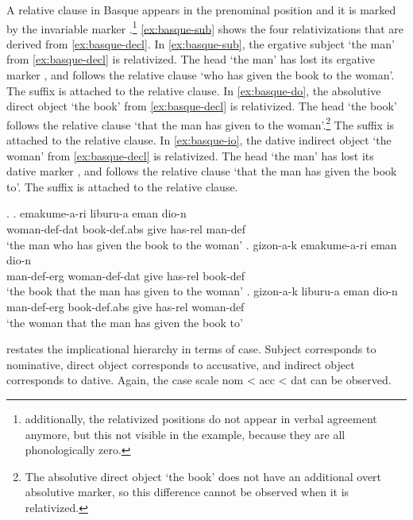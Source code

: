 A relative clause in Basque appears in the prenominal position and it is marked by the invariable marker .\footnote{
additionally, the relativized positions do not appear in verbal agreement anymore, but this not visible in the example, because they are all phonologically zero.
}
\ref{ex:basque-sub} shows the four relativizations that are derived from \ref{ex:basque-decl}.
In \ref{ex:basque-sub}, the ergative subject  `the man' from \ref{ex:basque-decl} is relativized. The head  `the man' has lost its ergative marker , and follows the relative clause  `who has given the book to the woman'. The suffix  is attached to the relative clause.
In \ref{ex:basque-do}, the absolutive direct object  `the book' from \ref{ex:basque-decl} is relativized. The head  `the book' follows the relative clause  `that the man has given to the woman'.\footnote{
The absolutive direct object  `the book' does not have an additional overt absolutive marker, so this difference cannot be observed when it is relativized.
}
The suffix  is attached to the relative clause.
In \ref{ex:basque-io}, the dative indirect object  `the woman' from \ref{ex:basque-decl} is relativized. The head  `the man' has lost its dative marker , and follows the relative clause  `that the man has given the book to'. The suffix  is attached to the relative clause.

\ex.\label{ex:basque-rel}
\ag. emakume-a-ri liburu-a eman dio-n \\
 woman-\ac{def}-\ac{dat} book-\ac{def}.\ac{abs} give has-\ac{rel} man-\ac{def}\\
 `the man who has given the book to the woman'\label{ex:basque-sub}
\bg. gizon-a-k emakume-a-ri eman dio-n \\
 man-\ac{def}-\ac{erg} woman-\ac{def}-\ac{dat} give has-\ac{rel} book-\ac{def}\\
 `the book that the man has given to the woman'\label{ex:basque-do}
\bg. gizon-a-k liburu-a eman dio-n \\
 man-\ac{def}-\ac{erg} book-\ac{def}.\ac{abs} give has-\ac{rel} woman-\ac{def}\\
 `the woman that the man has given the book to' \label{ex:basque-io}

\citealt{caha2009} restates the implicational hierarchy in terms of case. Subject corresponds to nominative, direct object corresponds to accusative, and indirect object corresponds to dative. Again, the case scale \ac{nom} < \ac{acc} < \ac{dat} can be observed.


